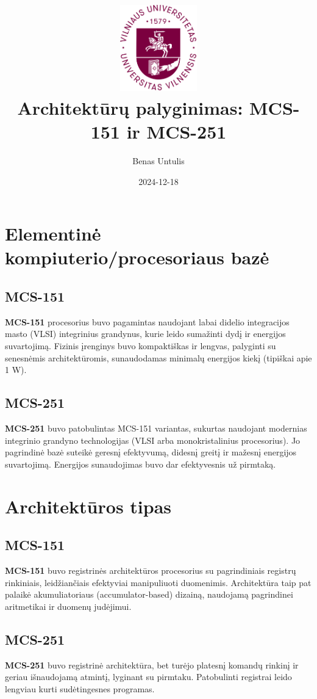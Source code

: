\documentclass[a4paper,12pt]{article}
\title{ %
    \centering
    \vspace{-1cm} %
    \includegraphics[width=0.25\textwidth]{vu_logo.png} \\ %
    \vspace{0,2cm} %
    Architektūrų palyginimas: MCS-151 ir MCS-251
}
\author{Benas Untulis}
\date{2024-12-18}
\begin{document}
\maketitle

\tableofcontents
\newpage

\section{Elementinė kompiuterio/procesoriaus bazė}
\subsection{MCS-151}
\textbf{MCS-151} procesorius buvo pagamintas naudojant labai didelio integracijos masto (VLSI) integrinius grandynus, kurie leido sumažinti dydį ir energijos suvartojimą. Fizinis įrenginys buvo kompaktiškas ir lengvas, palyginti su senesnėmis architektūromis, sunaudodamas minimalų energijos kiekį (tipiškai apie 1 W).

\subsection{MCS-251}
\textbf{MCS-251} buvo patobulintas MCS-151 variantas, sukurtas naudojant modernias integrinio grandyno technologijas (VLSI arba monokristalinius procesorius). Jo pagrindinė bazė suteikė geresnį efektyvumą, didesnį greitį ir mažesnį energijos suvartojimą. Energijos sunaudojimas buvo dar efektyvesnis už pirmtaką.


 
\section{Architektūros tipas}
\subsection{MCS-151}
\textbf{MCS-151} buvo registrinės architektūros procesorius su pagrindiniais registrų rinkiniais, leidžiančiais efektyviai manipuliuoti duomenimis. Architektūra taip pat palaikė akumuliatoriaus (accumulator-based) dizainą, naudojamą pagrindinei aritmetikai ir duomenų judėjimui.

\subsection{MCS-251}
\textbf{MCS-251} buvo registrinė architektūra, bet turėjo platesnį komandų rinkinį ir geriau išnaudojamą atmintį, lyginant su pirmtaku. Patobulinti registrai leido lengviau kurti sudėtingesnes programas.
\end{document}
